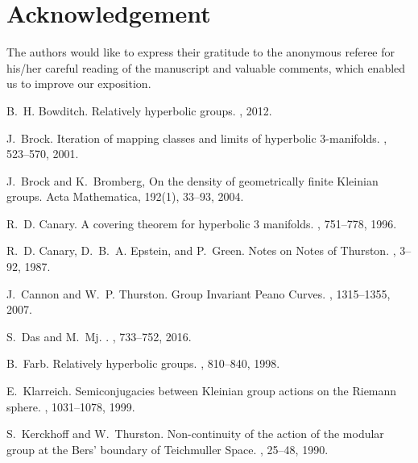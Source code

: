 \documentclass{amsart}
\theoremstyle{definition}
\begin{document}
\section*{Acknowledgement} The authors would like to express their gratitude to the anonymous referee for his/her careful reading of the manuscript and valuable comments, which enabled us to improve our exposition.




\begin{thebibliography}{CEG87}

B.~H. Bowditch.
\newblock Relatively hyperbolic groups.
, 2012.

J.~Brock.
\newblock Iteration of mapping classes and limits of hyperbolic 3-manifolds.
,  523--570, 2001.

J.~Brock and K.~Bromberg,
\newblock On the density of geometrically finite Kleinian groups. Acta Mathematica, 192(1), 33--93, 2004. 

R.~D. Canary.
\newblock A covering theorem for hyperbolic 3 manifolds.
,  751--778, 1996.

R.~D. Canary, D.~B.~A. Epstein, and P.~Green.
\newblock Notes on {N}otes of {T}hurston.
, 
  3--92, 1987.

J.~Cannon and W.~P. Thurston.
\newblock Group {I}nvariant {P}eano {C}urves.
, 1315--1355, 2007.

S.~Das and M.~Mj.
.
,  733--752, 2016.

B.~Farb.
\newblock Relatively hyperbolic groups.
, 810--840, 1998.

E.~Klarreich.
\newblock Semiconjugacies between {K}leinian group actions on the {R}iemann
  sphere.
,  1031--1078, 1999.

S.~Kerckhoff and W.~Thurston.
\newblock Non-continuity of the action of the modular group at the {Bers'
  boundary of Teichmuller Space}.
,  25--48, 1990.


\end{thebibliography}
\end{document}
